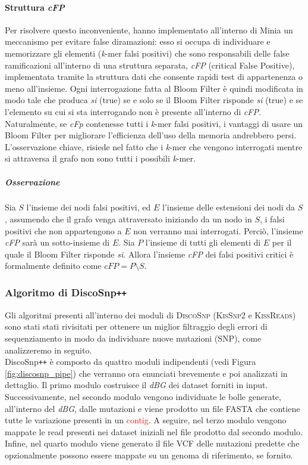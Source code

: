 \documentclass[../main.tex]{subfiles}
\begin{document}
\paragraph{Struttura \textit{cFP}} Per risolvere questo inconveniente,\cite{chikhi2013space} hanno implementato all'interno di Minia un meccanismo per evitare false diramazioni: esso si occupa di individuare e memorizzare gli elementi (\textit{k}-mer falsi positivi) che sono responsabili delle false ramificazioni all'interno di una struttura separata, \textit{cFP} (critical False Positive), implementata tramite la struttura dati che consente rapidi test di appartenenza o meno all'insieme. Ogni interrogazione fatta al Bloom Filter è quindi modificata in modo tale che produca \textit{si} (true) se e solo se il Bloom Filter risponde \textit{si} (true) e se l'elemento su cui si sta interrogando non è presente all'interno di \textit{cFP}. Naturalmente, se \textit{cFp} contenesse tutti i \textit{k}-mer falsi positivi, i vantaggi di usare un Bloom Filter per migliorare l'efficienza dell'uso della memoria andrebbero persi. L'osservazione chiave, risiede nel fatto che i \textit{k}-mer che vengono interrogati mentre si attraversa il grafo non sono tutti i possibili \textit{k}-mer. 

\subparagraph{Osservazione} Sia $S$ l'insieme dei nodi falsi positivi, ed $E$ l'insieme delle estensioni dei nodi da $S$, assumendo che il grafo venga attraversato iniziando da un nodo in $S$, i falsi positivi che non appartengono a $E$ non verranno mai interrogati. Perciò, l'insieme \textit{cFP} sarà un sotto-insieme di $E$. Sia $P$ l'insieme di tutti gli elementi di $E$ per il quale il Bloom Filter risponde \textit{si}. Allora l'insieme \textit{cFP} dei falsi positivi critici è formalmente definito come $cFP = P \setminus S$.

\subsubsection{Algoritmo di DiscoSnp\texttt{++}}
Gli algoritmi presenti all'interno dei moduli di \textsc{DiscoSnp} (\textsc{KisSnp2} e \textsc{KissReads}) sono stati stati rivisitati per ottenere un miglior filtraggio degli errori di sequenziamento in modo da individuare nuove mutazioni (SNP), come analizzeremo in seguito.\\

\noindent
DiscoSnp\texttt{++} è composto da quattro moduli indipendenti (vedi Figura \ref{fig:discosnp_pipe}) che verranno ora enunciati brevemente e poi analizzati in dettaglio. Il primo modulo costruisce il \textit{dBG} dei dataset forniti in input. Successivamente, nel secondo modulo vengono individuate le bolle generate, all'interno del \textit{dBG}, dalle mutazioni e viene prodotto un file FASTA che contiene tutte le variazione presenti in un \textcolor{red}{contig}. A seguire, nel terzo modulo vengono mappate le read presenti nei dataset iniziali nel file prodotto dal secondo modulo. Infine, nel quarto modulo viene generato il file VCF delle mutazioni predette che opzionalmente possono essere mappate su un genoma di riferimento, se fornito.
\end{document}
